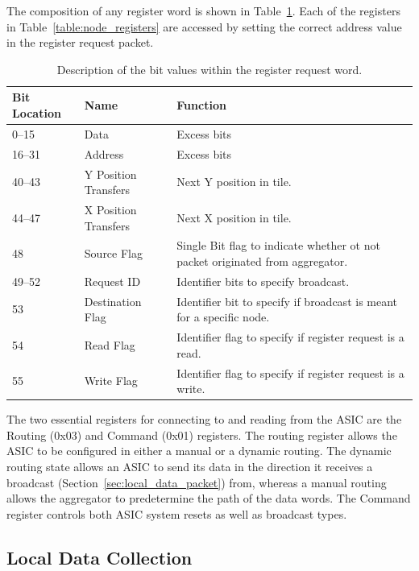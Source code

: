 The composition of any register word is shown in Table~\ref{tab:packet_register}.
Each of the registers in Table~\ref{table:node_registers} are accessed by setting the correct address value in the register request packet.
\begin{table}
\begin{center}
\begin{tabular}{|| p{30mm} | p{30mm} | p{90mm} ||}
 \hline
 Bit Location & Name & Function \\ [0.5ex]
 \hline\hline
  0--15 & Data & Excess bits  \\
 \hline
  16--31 & Address & Excess bits  \\
 \hline
  40--43 & Y Position Transfers & Next Y position in tile. \\
 \hline
  44--47 & X Position Transfers & Next X position in tile. \\
 \hline
  48 & Source Flag & Single Bit flag to indicate whether ot not packet originated from aggregator. \\
 \hline
  49--52 & Request ID & Identifier bits to specify broadcast. \\
 \hline
  53 & Destination Flag & Identifier bit to specify if broadcast is meant for a specific node. \\
 \hline
  54 & Read Flag & Identifier flag to specify if register request is a read. \\
 \hline
  55 & Write Flag & Identifier flag to specify if register request is a write. \\
 \hline
\end{tabular}
\caption{Description of the bit values within the register request word.}
\label{tab:packet_register}
\end{center}
\end{table}

The two essential registers for connecting to and reading from the ASIC are the Routing (0x03) and Command (0x01) registers.
The routing register allows the ASIC to be configured in either a manual or a dynamic routing.
The dynamic routing state allows an ASIC to send its data in the direction it receives a broadcast (Section~\ref{sec:local_data_packet}) from, whereas a manual routing allows the aggregator to predetermine the path of the data words.
The Command register controls both ASIC system resets as well as broadcast types.

\subsection{Local Data Collection}~\label{sec:data_collection}

